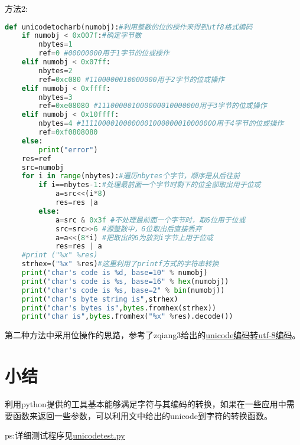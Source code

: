 \documentclass[twoside,11pt]{book}
\begin{document}
方法2:
\begin{lstlisting}[language=python]
def unicodetocharb(numobj):#利用整数的位的操作来得到utf8格式编码
    if numobj < 0x007f:#确定字节数
        nbytes=1
        ref=0 #00000000用于1字节的位或操作
    elif numobj < 0x07ff:
        nbytes=2
        ref=0xc080 #1100000010000000用于2字节的位或操作
    elif numobj < 0xffff:
        nbytes=3
        ref=0xe08080 #111000001000000010000000用于3字节的位或操作
    elif numobj < 0x10ffff:
        nbytes=4 #11110000100000001000000010000000用于4字节的位或操作
        ref=0xf0808080
    else:
        print("error")
    res=ref
    src=numobj
    for i in range(nbytes):#遍历nbytes个字节，顺序是从后往前
        if i==nbytes-1:#处理最前面一个字节时剩下的位全部取出用于位或
            a=src<<(i*8)
            res=res |a
        else:
            a=src & 0x3f #不处理最前面一个字节时，取6位用于位或
            src=src>>6 #源整数中，6位取出后直接丢弃
            a=a<<(8*i) #把取出的6为放到i字节上用于位或
            res=res | a
    #print ("%x" %res)
    strhex=("%x" %res)#这里利用了printf方式的字符串转换
    print("char's code is %d, base=10" % numobj)
    print("char's code is %s, base=16" % hex(numobj))
    print("char's code is %s, base=2" % bin(numobj))
    print("char's byte string is",strhex)
    print("char's bytes is",bytes.fromhex(strhex))
    print("char is",bytes.fromhex("%x" %res).decode())
\end{lstlisting}

第二种方法中采用位操作的思路，参考了zqiang3给出的\href{www.unicode.org}{unicode编码转utf-8编码}。


\section{小结}

利用python提供的工具基本能够满足字符与其编码的转换，如果在一些应用中需要函数来返回一些参数，可以利用文中给出的unicode到字符的转换函数。

ps:详细测试程序见\href{run:./unicodetest.py}{unicodetest.py}
\end{document}
